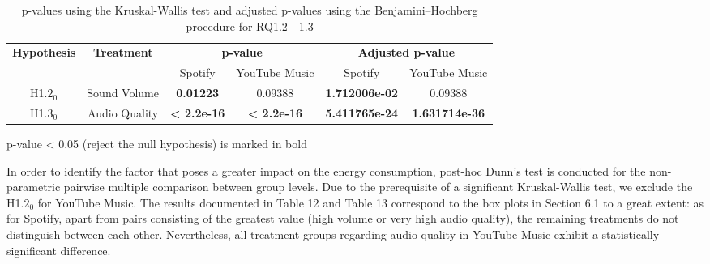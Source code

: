 \begin{table*}[t]
\centering
\caption{p-values using the Kruskal-Wallis test and adjusted p-values using the Benjamini–Hochberg procedure for RQ1.2 - 1.3}
\begin{threeparttable}
\label{table1}
\begin{tabular}{|c|c|c|c|c|c|}
\hline
\multirow{2}{*}{\textbf{Hypothesis}}  &
\multirow{2}{*}{\textbf{Treatment}} & \multicolumn{2}{c|}{\textbf{p-value}} & \multicolumn{2}{c|}{\textbf{Adjusted p-value}}\\
\cline{3-6}

 & & Spotify & YouTube Music & Spotify & YouTube Music

 \\
\hline

H1.$2_0$ & Sound Volume & \textbf{0.01223}
&0.09388
&\textbf{1.712006e-02}
&0.09388
 \\
\hline

H1.$3_0$ & Audio Quality & \textbf{< 2.2e-16} & 
\textbf{< 2.2e-16} & 
\textbf{5.411765e-24} & 
\textbf{1.631714e-36} 
 \\ 
\hline


\end{tabular}
\label{table_MAP}
 \begin{tablenotes}
        \footnotesize
        \item * p-value < 0.05 (\ie reject the null hypothesis) is marked in bold 
      \end{tablenotes}
  \end{threeparttable}
\end{table*}

In order to identify the factor that poses a greater impact on the energy consumption, post-hoc Dunn’s test is conducted for the non-parametric pairwise multiple comparison between group levels. Due to the prerequisite of a significant Kruskal-Wallis test, we exclude the H1.$2_0$ for YouTube Music. The results documented in Table 12 and Table 13 correspond to the box plots in Section 6.1 to a great extent: as for Spotify, apart from pairs consisting of the greatest value (\ie high volume or very high audio quality), the remaining treatments do not distinguish between each other. Nevertheless, all treatment groups regarding audio quality in YouTube Music exhibit a statistically significant difference.

